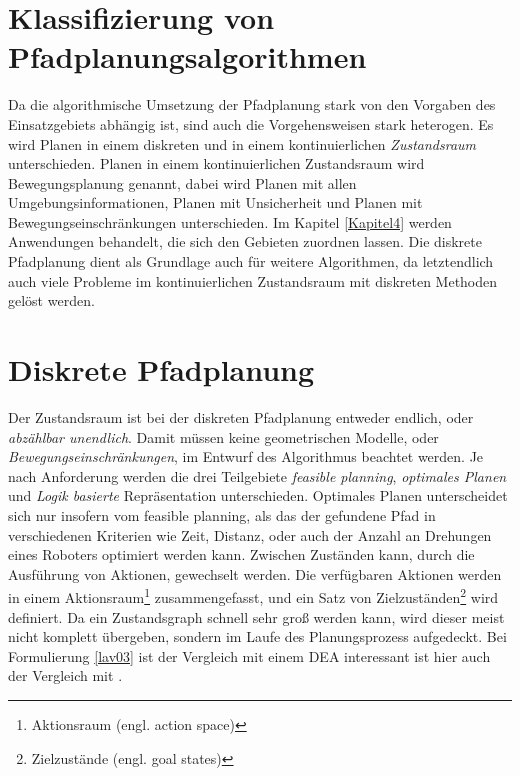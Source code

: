 \section{Klassifizierung von Pfadplanungsalgorithmen} \label{Kapitel 3.2} 
Da die algorithmische Umsetzung der Pfadplanung stark von den Vorgaben des Einsatzgebiets abhängig ist, sind auch die Vorgehensweisen stark heterogen.
Es wird Planen in einem diskreten und in einem kontinuierlichen \textit{Zustandsraum} unterschieden. Planen in einem kontinuierlichen Zustandsraum wird Bewegungsplanung genannt, dabei wird Planen mit allen Umgebungsinformationen, Planen mit Unsicherheit und Planen mit Bewegungseinschränkungen unterschieden\cite[~S. 24-26]{Lav06}.
Im Kapitel \ref{Kapitel4} werden Anwendungen behandelt, die sich den Gebieten zuordnen lassen. 
 Die diskrete Pfadplanung dient als Grundlage auch für weitere Algorithmen, da letztendlich auch viele Probleme im kontinuierlichen Zustandsraum mit diskreten Methoden gelöst werden\cite[~S. 25]{Lav06}. 

\section{Diskrete Pfadplanung} \label{Kapitel 4.3} 
Der Zustandsraum ist bei der diskreten Pfadplanung entweder endlich, oder \textit{abzählbar unendlich}.
Damit müssen keine geometrischen Modelle, oder \textit{Bewegungseinschränkungen},  im Entwurf des Algorithmus beachtet werden.
Je nach Anforderung werden die drei Teilgebiete \textit{feasible planning}, \textit{optimales Planen} und \textit{Logik basierte} Repräsentation unterschieden\cite[~S. 27]{Lav06}.
Optimales Planen unterscheidet sich nur insofern vom feasible planning, als das der gefundene Pfad in verschiedenen Kriterien wie Zeit, Distanz, oder auch der Anzahl an Drehungen eines Roboters optimiert werden kann\cite[~S. 43]{Lav06}.
Zwischen Zuständen kann, durch die Ausführung von Aktionen, gewechselt werden. Die verfügbaren Aktionen werden in einem Aktionsraum\footnote{Aktionsraum (engl. action space) } zusammengefasst, und ein Satz von Zielzuständen\footnote{Zielzustände (engl. goal states)} wird definiert. 
Da ein Zustandsgraph schnell sehr groß werden kann, wird dieser meist nicht komplett übergeben, sondern im Laufe des Planungsprozess aufgedeckt\cite[~S. 43]{Lav06}. 
Bei Formulierung \ref{lav03} ist der Vergleich mit einem DEA interessant ist hier auch der Vergleich mit \cite[~S. 233]{Schmitz:19}.

